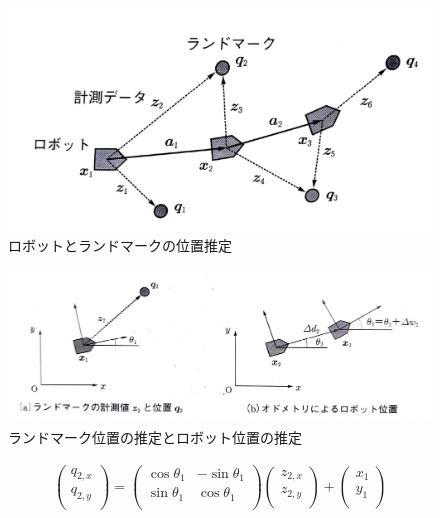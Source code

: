 \begin{figure}[h]
  \begin{center}
  \includegraphics[width=\linewidth]{img/slam_6.pdf}
  \caption{ロボットとランドマークの位置推定\cite{slam:nyumon}}
  \label{slam:chizu2}
  \end{center}
\end{figure}

\begin{figure}[h]
  \begin{center}
  \includegraphics[width=\columnwidth]{img/slam_7.pdf}
  \caption{ランドマーク位置の推定とロボット位置の推定\cite{slam:nyumon}}
  \label{slam:suitei}
  \end{center}
\end{figure}

\clearpage

\begin{align}
  \begin{pmatrix}
    q_{2,x}\\
    q_{2,y}\\
  \end{pmatrix}
  =
  \begin{pmatrix}
    \cos\theta_1&-\sin\theta_1\\
    \sin\theta_1&\cos\theta_1\\
  \end{pmatrix}
  \begin{pmatrix}
    z_{2,x}\\
    z_{2,y}\\
  \end{pmatrix}
  +
  \begin{pmatrix}
    x_1\\
    y_1\\
  \end{pmatrix} \label{slam:eq:q2}
\end{align}

